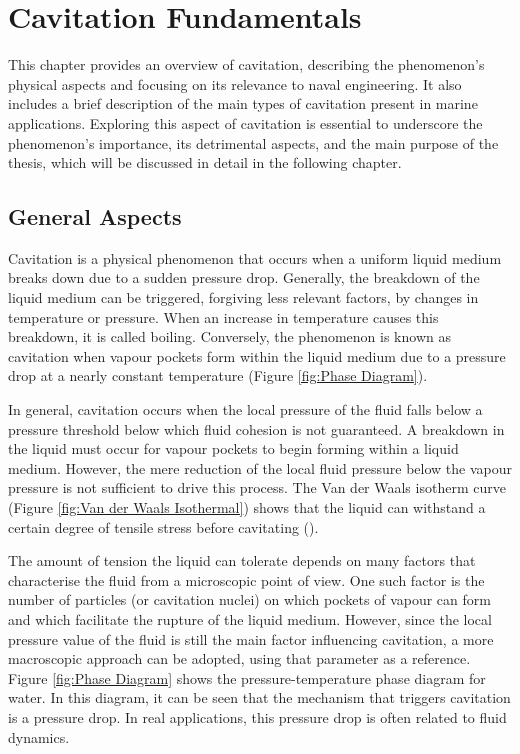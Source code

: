 \chapter{Cavitation Fundamentals}
\label{chap:chapter2}

This chapter provides an overview of cavitation, describing the phenomenon's physical aspects and focusing on its relevance to naval engineering. It also includes a brief description of the main types of cavitation present in marine applications.
Exploring this aspect of cavitation is essential to underscore the phenomenon's importance, its detrimental aspects, and the main purpose of the thesis, which will be discussed in detail in the following chapter.

\section{General Aspects} 

Cavitation is a physical phenomenon that occurs when a uniform liquid medium breaks down due to a sudden pressure drop. Generally, the breakdown of the liquid medium can be triggered, forgiving less relevant factors, by changes in temperature or pressure. When an increase in temperature causes this breakdown, it is called boiling. Conversely, the phenomenon is known as cavitation when vapour pockets form within the liquid medium due to a pressure drop at a nearly constant temperature (Figure \ref{fig:Phase Diagram}).

In general, cavitation occurs when the local pressure of the fluid falls below a pressure threshold below which fluid cohesion is not guaranteed. 
A breakdown in the liquid must occur for vapour pockets to begin forming within a liquid medium. However, the mere reduction of the local fluid pressure below the vapour pressure is not sufficient to drive this process. The Van der Waals isotherm curve (Figure \ref{fig:Van der Waals Isothermal}) shows that the liquid can withstand a certain degree of tensile stress before cavitating (\cite{carlton2018marine}).

The amount of tension the liquid can tolerate depends on many factors that characterise the fluid from a microscopic point of view. One such factor is the number of particles (or cavitation nuclei) on which pockets of vapour can form and which facilitate the rupture of the liquid medium. 
However, since the local pressure value of the fluid is still the main factor influencing cavitation, a more macroscopic approach can be adopted, using that parameter as a reference.
Figure \ref{fig:Phase Diagram} shows the pressure-temperature phase diagram for water. In this diagram, it can be seen that the mechanism that triggers cavitation is a pressure drop. 
In real applications, this pressure drop is often related to fluid dynamics.

